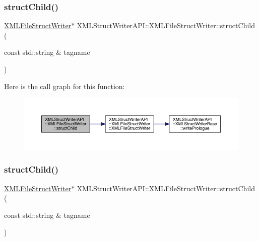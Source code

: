 \subsubsection{\texorpdfstring{structChild()}{structChild()}\hspace{0.1cm}{\footnotesize\ttfamily [1/2]}}
{\footnotesize\ttfamily \mbox{\hyperlink{classXMLStructWriterAPI_1_1XMLFileStructWriter}{X\+M\+L\+File\+Struct\+Writer}}$\ast$ X\+M\+L\+Struct\+Writer\+A\+P\+I\+::\+X\+M\+L\+File\+Struct\+Writer\+::struct\+Child (\begin{DoxyParamCaption}\item[{const std\+::string \&}]{tagname }\end{DoxyParamCaption})\hspace{0.3cm}{\ttfamily [inline]}}

Here is the call graph for this function\+:
\nopagebreak
\begin{figure}[H]
\begin{center}
\leavevmode
\includegraphics[width=350pt]{db/de3/classXMLStructWriterAPI_1_1XMLFileStructWriter_a29ff0f4353991294bab0c75ab8895f73_cgraph}
\end{center}
\end{figure}
\mbox{\label{classXMLStructWriterAPI_1_1XMLFileStructWriter_a29ff0f4353991294bab0c75ab8895f73}} 
\subsubsection{\texorpdfstring{structChild()}{structChild()}\hspace{0.1cm}{\footnotesize\ttfamily [2/2]}}
{\footnotesize\ttfamily \mbox{\hyperlink{classXMLStructWriterAPI_1_1XMLFileStructWriter}{X\+M\+L\+File\+Struct\+Writer}}$\ast$ X\+M\+L\+Struct\+Writer\+A\+P\+I\+::\+X\+M\+L\+File\+Struct\+Writer\+::struct\+Child (\begin{DoxyParamCaption}\item[{const std\+::string \&}]{tagname }\end{DoxyParamCaption})\hspace{0.3cm}{\ttfamily [inline]}}

